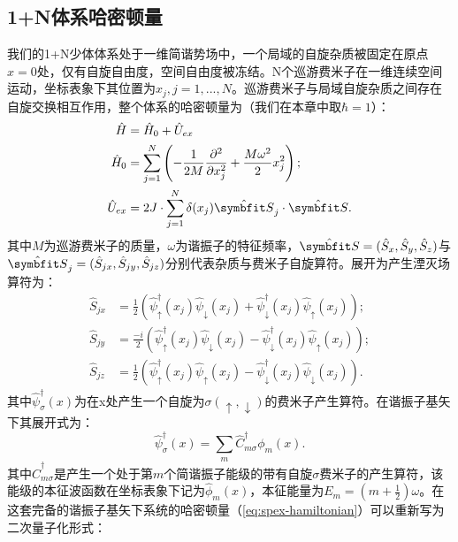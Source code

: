 \subsection{1+N体系哈密顿量}
我们的1+N少体体系处于一维简谐势场中，一个局域的自旋杂质被固定在原点$x=0$处，仅有自旋自由度，空间自由度被冻结。N个巡游费米子在一维连续空间运动，坐标表象下其位置为$x_j,j=1,...,N$。巡游费米子与局域自旋杂质之间存在自旋交换相互作用，整个体系的哈密顿量为（我们在本章中取$\hbar=1$）：
\begin{equation}\label{eq:spex-hamiltonian}
    \begin{split}
       	\hat{H}  &= \hat{H}_0 + \hat{U}_{ex}\\
		\hat{H}_0 &= \sum_{j=1}^{N} \left( -\frac{1}{2M} \frac{\partial^2}{\partial x_{j}^2}   +\frac{M\omega^2}{2}x_{j}^2 \right); \\
		\hat{U}_{ex} &= 2J\cdot\sum_{j=1}^N\delta(x_j){\hat{\Vector{S}}}_j\cdot {\hat{\Vector{S}}}.
    \end{split}
\end{equation}
其中$M$为巡游费米子的质量，$\omega$为谐振子的特征频率，$\hat{\Vector{S}}=(\hat{S}_{x},\hat{S}_{y},\hat{S}_{z})$与$\hat{\Vector{S}}_j=(\hat{S}_{jx},\hat{S}_{jy},\hat{S}_{jz})$分别代表杂质与费米子自旋算符。展开为产生湮灭场算符为：
\begin{equation}\label{eq:spex-field}
    \begin{split}
		\hat{S}_{jx} &= \frac{1}{2}(\hat{\psi}_{\uparrow}^{\dag}(x_j)\hat{\psi}_{\downarrow}(x_j)+\hat{\psi}_{\downarrow}^{\dag}(x_j)\hat{\psi}_{\uparrow}(x_j));\\
		\hat{S}_{jy} &= \frac{-i}{2}(\hat{\psi}_{\uparrow}^{\dag}(x_j)\hat{\psi}_{\downarrow}(x_j)-\hat{\psi}_{\downarrow}^{\dag}(x_j)\hat{\psi}_{\uparrow}(x_j));\\
		\hat{S}_{jz} &= \frac{1}{2}(\hat{\psi}_{\uparrow}^{\dag}(x_j)\hat{\psi}_{\uparrow}(x_j)-\hat{\psi}_{\downarrow}^{\dag}(x_j)\hat{\psi}_{\downarrow}(x_j)).
    \end{split}
\end{equation}
其中$\hat{\psi}_{\sigma}^{\dag}(x)$为在x处产生一个自旋为$\sigma(\uparrow,\downarrow)$的费米子产生算符。在谐振子基矢下其展开式为：
\begin{equation}
	\hat{\psi}_{\sigma}^{\dag}(x)=\sum_m \hat{C}_{m\sigma}^{\dag} \phi_m(x).
\end{equation}
其中$\hat{C}_{m\sigma}^\dagger$是产生一个处于第$m$个简谐振子能级的带有自旋$\sigma$费米子的产生算符，该能级的本征波函数在坐标表象下记为$\hat{\phi}_m(x)$，本征能量为$E_m = (m+\frac{1}{2})\omega$。在这套完备的谐振子基矢下系统的哈密顿量（\ref{eq:spex-hamiltonian}）可以重新写为二次量子化形式：
